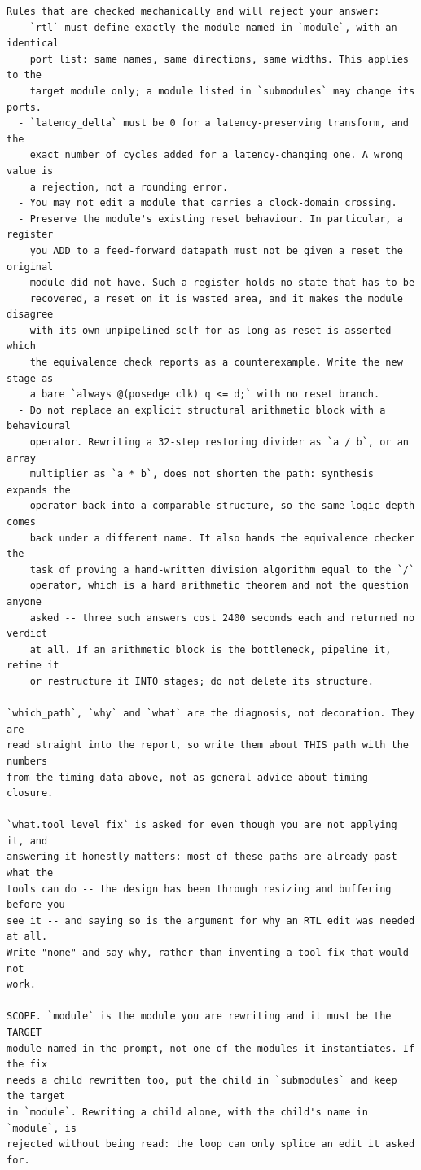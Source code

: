 \begin{lstlisting}[style=plain]
Rules that are checked mechanically and will reject your answer:
  - `rtl` must define exactly the module named in `module`, with an identical
    port list: same names, same directions, same widths. This applies to the
    target module only; a module listed in `submodules` may change its ports.
  - `latency_delta` must be 0 for a latency-preserving transform, and the
    exact number of cycles added for a latency-changing one. A wrong value is
    a rejection, not a rounding error.
  - You may not edit a module that carries a clock-domain crossing.
  - Preserve the module's existing reset behaviour. In particular, a register
    you ADD to a feed-forward datapath must not be given a reset the original
    module did not have. Such a register holds no state that has to be
    recovered, a reset on it is wasted area, and it makes the module disagree
    with its own unpipelined self for as long as reset is asserted -- which
    the equivalence check reports as a counterexample. Write the new stage as
    a bare `always @(posedge clk) q <= d;` with no reset branch.
  - Do not replace an explicit structural arithmetic block with a behavioural
    operator. Rewriting a 32-step restoring divider as `a / b`, or an array
    multiplier as `a * b`, does not shorten the path: synthesis expands the
    operator back into a comparable structure, so the same logic depth comes
    back under a different name. It also hands the equivalence checker the
    task of proving a hand-written division algorithm equal to the `/`
    operator, which is a hard arithmetic theorem and not the question anyone
    asked -- three such answers cost 2400 seconds each and returned no verdict
    at all. If an arithmetic block is the bottleneck, pipeline it, retime it
    or restructure it INTO stages; do not delete its structure.

`which_path`, `why` and `what` are the diagnosis, not decoration. They are
read straight into the report, so write them about THIS path with the numbers
from the timing data above, not as general advice about timing closure.

`what.tool_level_fix` is asked for even though you are not applying it, and
answering it honestly matters: most of these paths are already past what the
tools can do -- the design has been through resizing and buffering before you
see it -- and saying so is the argument for why an RTL edit was needed at all.
Write "none" and say why, rather than inventing a tool fix that would not
work.

SCOPE. `module` is the module you are rewriting and it must be the TARGET
module named in the prompt, not one of the modules it instantiates. If the fix
needs a child rewritten too, put the child in `submodules` and keep the target
in `module`. Rewriting a child alone, with the child's name in `module`, is
rejected without being read: the loop can only splice an edit it asked for.


\end{lstlisting}
